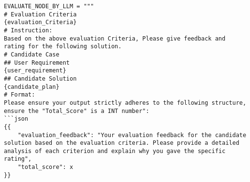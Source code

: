 \begin{lstlisting}[style=pythonstyle]
EVALUATE_NODE_BY_LLM = """
# Evaluation Criteria
{evaluation_Criteria}
# Instruction:
Based on the above evaluation Criteria, Please give feedback and rating for the following solution. 
# Candidate Case
## User Requirement
{user_requirement}
## Candidate Solution
{candidate_plan}
# Format:
Please ensure your output strictly adheres to the following structure, ensure the "Total_Score" is a INT number":
```json
{{
    "evaluation_feedback": "Your evaluation feedback for the candidate solution based on the evaluation criteria. Please provide a detailed analysis of each criterion and explain why you gave the specific rating",
    "total_score": x
}}
\end{lstlisting}
